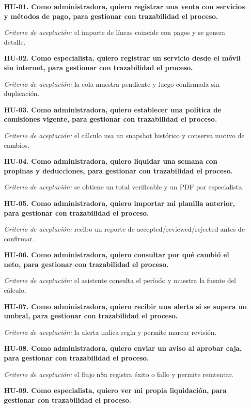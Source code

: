 
\textbf{HU-01. Como administradora, quiero registrar una venta con servicios y métodos de pago, para gestionar con trazabilidad el proceso.}


\textit{Criterio de aceptación:} el importe de líneas coincide con pagos y se genera detalle.


\textbf{HU-02. Como especialista, quiero registrar un servicio desde el móvil sin internet, para gestionar con trazabilidad el proceso.}


\textit{Criterio de aceptación:} la cola muestra pendiente y luego confirmada sin duplicación.


\textbf{HU-03. Como administradora, quiero establecer una política de comisiones vigente, para gestionar con trazabilidad el proceso.}


\textit{Criterio de aceptación:} el cálculo usa un snapshot histórico y conserva motivo de cambios.


\textbf{HU-04. Como administradora, quiero liquidar una semana con propinas y deducciones, para gestionar con trazabilidad el proceso.}


\textit{Criterio de aceptación:} se obtiene un total verificable y un PDF por especialista.


\textbf{HU-05. Como administradora, quiero importar mi planilla anterior, para gestionar con trazabilidad el proceso.}


\textit{Criterio de aceptación:} recibo un reporte de accepted/reviewed/rejected antes de confirmar.


\textbf{HU-06. Como administradora, quiero consultar por qué cambió el neto, para gestionar con trazabilidad el proceso.}


\textit{Criterio de aceptación:} el asistente consulta el período y muestra la fuente del cálculo.


\textbf{HU-07. Como administradora, quiero recibir una alerta si se supera un umbral, para gestionar con trazabilidad el proceso.}


\textit{Criterio de aceptación:} la alerta indica regla y permite marcar revisión.


\textbf{HU-08. Como administradora, quiero enviar un aviso al aprobar caja, para gestionar con trazabilidad el proceso.}


\textit{Criterio de aceptación:} el flujo n8n registra éxito o fallo y permite reintentar.


\textbf{HU-09. Como especialista, quiero ver mi propia liquidación, para gestionar con trazabilidad el proceso.}


